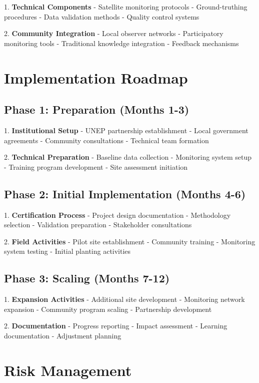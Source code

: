 \documentclass{article}
\theoremstyle{plain}
\theoremstyle{definition}
\theoremstyle{remark}
\begin{document}
\begin{multicols}{2}
1. \textbf{Technical Components}
   - Satellite monitoring protocols
   - Ground-truthing procedures
   - Data validation methods
   - Quality control systems

2. \textbf{Community Integration}
   - Local observer networks
   - Participatory monitoring tools
   - Traditional knowledge integration
   - Feedback mechanisms

\section{Implementation Roadmap}

\subsection{Phase 1: Preparation (Months 1-3)}

1. \textbf{Institutional Setup}
   - UNEP partnership establishment
   - Local government agreements
   - Community consultations
   - Technical team formation

2. \textbf{Technical Preparation}
   - Baseline data collection
   - Monitoring system setup
   - Training program development
   - Site assessment initiation

\subsection{Phase 2: Initial Implementation (Months 4-6)}

1. \textbf{Certification Process}
   - Project design documentation
   - Methodology selection
   - Validation preparation
   - Stakeholder consultations

2. \textbf{Field Activities}
   - Pilot site establishment
   - Community training
   - Monitoring system testing
   - Initial planting activities

\subsection{Phase 3: Scaling (Months 7-12)}

1. \textbf{Expansion Activities}
   - Additional site development
   - Monitoring network expansion
   - Community program scaling
   - Partnership development

2. \textbf{Documentation}
   - Progress reporting
   - Impact assessment
   - Learning documentation
   - Adjustment planning

\section{Risk Management}


\end{multicols}
\end{document}
